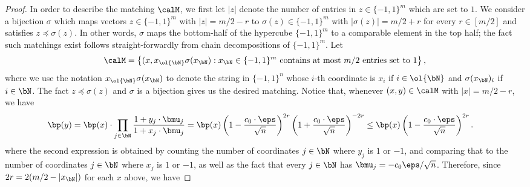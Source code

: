 \begin{proof}
% 
% 
In order to describe the matching $\calM$, we first let $|z|$ denote the number of entries in $z \in \{-1,1\}^m$ which are set to $1$. We consider a bijection $\sigma$ which maps vectors $z \in \{-1,1\}^m$ with $|z| = m / 2 - r$ to $\sigma(z) \in \{-1,1\}^m$ with $|\sigma(z)| = m/2 + r$ for every $r \in [m/2]$ and satisfies $z \preceq \sigma(z)$. In other words, $\sigma$ maps the bottom-half of the hypercube $\{-1,1\}^m$ to a comparable element in the top half; the fact such matchings exist follows straight-forwardly from chain decompositions of $\{-1,1\}^m$. Let
\begin{align*}
\calM = \left\{ (x, x_{\ol{\bN}}\sigma(x_{\bN}) : x_{\bN} \in \{-1,1\}^m \text{ contains at most $m/2$ entries set to $1$}\right\},
\end{align*}
where we use the notation $x_{\ol{\bN}} \sigma(x_{\bN})$ to denote the string in $\{-1,1\}^n$ whose $i$-th coordinate is $x_i$ if $i \in \ol{\bN}$ and $\sigma(x_{\bN})_i$ if $i\in \bN$. The fact $z \preceq \sigma(z)$ and $\sigma$ is a bijection gives us the desired matching. Notice that, whenever $(x,y) \in \calM$ with $|x| = m/2-r$, we have
\begin{align*} 
\bp(y) &= \bp(x) \cdot \prod_{j \in \bN} \dfrac{1 + y_j \cdot \bmu_j}{1 + x_j \cdot \bmu_j}  = \bp(x) \left(1 - \frac{c_0 \cdot \eps}{\sqrt{n}} \right)^{2r} \left( 1 + \frac{c_0\cdot \eps}{\sqrt{n}}\right)^{-2r} \leq \bp(x) \left(1 - \frac{c_0\cdot \eps}{\sqrt{n}}\right)^{2r}.
\end{align*}
where the second expression is obtained by counting the number of coordinates $j \in \bN$ where $y_j$ is $1$ or $-1$, and comparing that to the number of coordinates $j \in \bN$ where $x_j$ is $1$ or $-1$, as well as the fact that every $j \in \bN$ has $\bmu_j= -c_0 \eps /\sqrt{n}$. Therefore, since $2r = 2(m/2 - |x_{\bN}|)$ for each $x$ above, we have

\end{proof}
